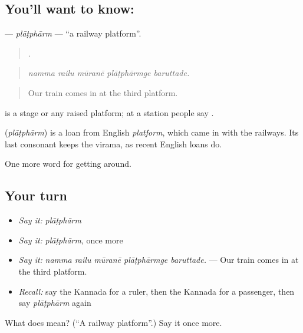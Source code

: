 \subsection*{You'll want to know: }
\textbf{} — \emph{plāṭphārm} — \textquotedblleft{}a railway platform\textquotedblright{}.

\begin{quote}
    .
\end{quote}

\begin{quote}
\emph{namma railu mūranē plāṭphārmge baruttade.}
\end{quote}

\begin{quote}
Our train comes in at the third platform.
\end{quote}

 is a stage or any raised platform; at a station people say .

\begin{cousinweb}
\textbf{} (\emph{plāṭphārm}) is a loan from English \emph{platform}, which came in with the railways. Its last consonant keeps the virama, as recent English loans do.
\end{cousinweb}

\begin{grammarlens}[title={What you've built}]
One more word for getting around.
\end{grammarlens}

\subsection*{Your turn}
\begin{itemize}
\raggedright
  \item \emph{Say it:} \emph{plāṭphārm}
  \item \emph{Say it:} \emph{plāṭphārm}, once more
  \item \emph{Say it:} \emph{namma railu mūranē plāṭphārmge baruttade.} — Our train comes in at the third platform.
  \item \emph{Recall:} say the Kannada for a ruler, then the Kannada for a passenger, then say \emph{plāṭphārm} again
\end{itemize}

\begin{tcolorbox}[breakable,colback=teal!4,colframe=teal!35!black,title={Before you move on}]
What does  mean? (\textquotedblleft{}A railway platform\textquotedblright{}.) Say it once more.
\end{tcolorbox}

